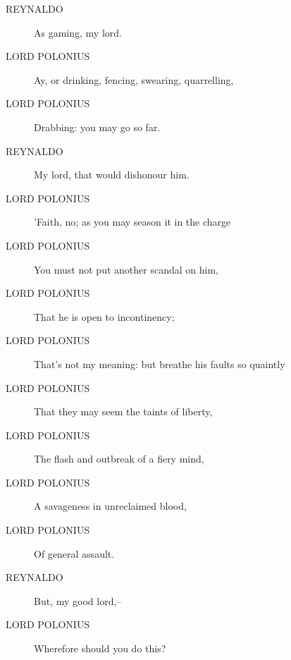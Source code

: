 \documentclass{article}
\begin{document}
\begin{description}
            
\item[REYNALDO] As gaming, my lord.
\end{description}
          
\begin{description}
            
\item[LORD POLONIUS] Ay, or drinking, fencing, swearing, quarrelling,
\item[LORD POLONIUS] Drabbing: you may go so far.
\end{description}
          
\begin{description}
            
\item[REYNALDO] My lord, that would dishonour him.
\end{description}
          
\begin{description}
            
\item[LORD POLONIUS] 'Faith, no; as you may season it in the charge
\item[LORD POLONIUS] You must not put another scandal on him,
\item[LORD POLONIUS] That he is open to incontinency;
\item[LORD POLONIUS] That's not my meaning: but breathe his faults so quaintly
\item[LORD POLONIUS] That they may seem the taints of liberty,
\item[LORD POLONIUS] The flash and outbreak of a fiery mind,
\item[LORD POLONIUS] A savageness in unreclaimed blood,
\item[LORD POLONIUS] Of general assault.
\end{description}
          
\begin{description}
            
\item[REYNALDO] But, my good lord,--
\end{description}
          
\begin{description}
            
\item[LORD POLONIUS] Wherefore should you do this?
\end{description}
          
\end{document}

